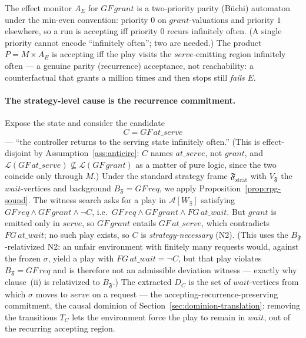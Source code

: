 \documentclass[11pt]{article}
\theoremstyle{remark}
\newcommand{\Lang}{\mathcal{L}}
\newcommand{\Frame}{\mathfrak{F}}
\begin{document}
The effect monitor \(A_E\) for \(GF\,grant\) is a two-priority parity (B\"uchi)
automaton under the min-even convention: priority \(0\) on \(grant\)-valuations
and priority \(1\) elsewhere, so a run is accepting iff priority \(0\) recurs
infinitely often. (A single priority cannot encode ``infinitely often''; two are
needed.) The product \(P=M\times A_E\) is accepting iff the play visits the
\(\mathit{serve}\)-emitting region infinitely often --- a genuine parity
(recurrence) acceptance, not reachability: a counterfactual that grants a million
times and then stops still \emph{fails} \(E\).

\paragraph{The strategy-level cause is the recurrence commitment.} Expose the
state and consider the candidate
\[
  C = GF\,\mathit{at\_serve}
\]
--- ``the controller returns to the serving state infinitely often.'' (This is
effect-disjoint by Assumption~\ref{ass:anticirc}: \(C\) names \(\mathit{at\_serve}\),
not \(grant\), and \(\Lang(GF\,\mathit{at\_serve})\not\subseteq\Lang(GF\,grant)\)
as a matter of pure logic, since the two coincide only through \(M\).) Under the
standard strategy frame \(\Frame_{\mathrm{strat}}\) with \(V_{\Frame}\) the
\(\mathit{wait}\)-vertices and background \(B_{\Frame}=GF\,req\), we apply
Proposition~\ref{prop:rpg-sound}. The witness search asks for a play in
\(\mathcal{A}[W_\exists]\) satisfying \(GF\,req\wedge GF\,grant\wedge\neg C\),
i.e.\ \(GF\,req\wedge GF\,grant\wedge FG\,\mathit{at\_wait}\). But \(grant\) is
emitted only in \(\mathit{serve}\), so \(GF\,grant\) entails
\(GF\,\mathit{at\_serve}\), which contradicts \(FG\,\mathit{at\_wait}\); no such
play exists, so \(C\) is \emph{strategy-necessary} (N2). (This uses the
\(B_{\Frame}\)-relativized N2: an unfair environment with finitely many requests
would, against the frozen \(\sigma\), yield a play with
\(FG\,\mathit{at\_wait}=\neg C\), but that play violates \(B_{\Frame}=GF\,req\) and
is therefore not an admissible deviation witness --- exactly why clause~(ii) is
relativized to \(B_{\Frame}\).) The extracted \(D_C\) is the set of
\(\mathit{wait}\)-vertices from which \(\sigma\) moves to \(\mathit{serve}\) on a
request --- the accepting-recurrence-preserving commitment, the causal dominion of
Section~\ref{sec:dominion-translation}: removing the transitions \(T_C\) lets the
environment force the play to remain in \(\mathit{wait}\), out of the recurring
accepting region.
\end{document}
